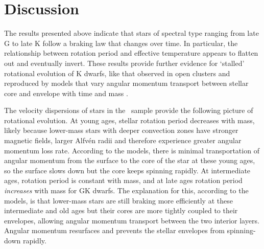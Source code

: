 \section{Discussion}
\label{sec:discussion}


The results presented above indicate that stars of spectral type ranging from
late G to late K follow a braking law that changes over time.
In particular, the relationship between rotation period and effective
temperature appears to flatten out and eventually invert.
These results provide further evidence for `stalled' rotational evolution of K
dwarfs, like that observed in open clusters \citep{curtis2019} and reproduced
by models that vary angular momentum transport between stellar core and
envelope with time and mass \citep{spada2019}.

The velocity dispersions of stars in the \mct\ sample provide the following
picture of rotational evolution.
At young ages, stellar rotation period decreases with mass, likely because
lower-mass stars with deeper convection zones have stronger magnetic fields,
larger Alfv\'en radii and therefore experience greater angular momentum loss
rate.
According to the \citet{spada2019} models, there is minimal transportation of
angular momentum from the surface to the core of the star at these young ages,
so the surface slows down but the core keeps spinning rapidly.
At intermediate ages, rotation period is constant with mass, and at late ages
rotation period {\it increases} with mass for GK dwarfs.
The explanation for this, according to the \citet{spada2019} models, is that
lower-mass stars are still braking more efficiently at these intermediate and
old ages but their cores are more tightly coupled to their envelopes, allowing
angular momentum transport between the two interior layers.
Angular momentum resurfaces and prevents the stellar envelopes from
spinning-down rapidly.

